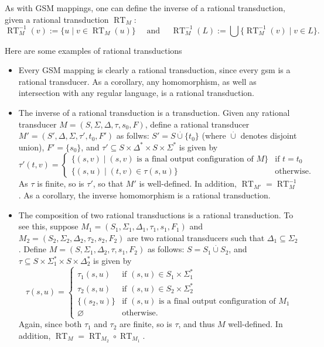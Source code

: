 \documentclass[12pt]{article}
\begin{document}
As with GSM mappings, one can define the inverse of a rational transduction, given a rational transduction $\operatorname{RT}_M$: $$\operatorname{RT}_M^{-1}(v):=\lbrace u\mid v\in \operatorname{RT}_M(u) \rbrace \quad\mbox{ and }\quad \operatorname{RT}_M^{-1}(L):=\bigcup \lbrace \operatorname{RT}_M^{-1}(v) \mid v\in L\rbrace.$$

Here are some examples of rational transductions
\begin{itemize}
\item Every GSM mapping is clearly a rational transduction, since every gsm is a rational transducer.  As a corollary, any homomorphism, as well as intersection with any regular language, is a rational transduction.
\item The inverse of a rational transduction is a transduction.  Given any rational transducer $M=(S,\Sigma,\Delta,\tau, s_0,F)$, define a rational transducer $M'=(S',\Delta,\Sigma,\tau',t_0,F')$ as follws: $S'=S\stackrel{\cdot}{\cup}\lbrace t_0\rbrace$ (where $\stackrel{\cdot}{\cup}$ denotes disjoint union), $F'=\lbrace s_0\rbrace$, and $\tau' \subseteq S\times \Delta^* \times S\times \Sigma^*$ is given by 
\begin{displaymath}
\tau'(t,v) = \left\{
\begin{array}{ll}
\lbrace (s,v)\mid (s,v)\mbox{ is a final output configuration of }M \rbrace & \textrm{if } t=t_0 \\
\lbrace (s,u)\mid (t,v)\in \tau(s,u) \rbrace & \textrm{otherwise.}
\end{array}
\right.
\end{displaymath}
As $\tau$ is finite, so is $\tau'$, so that $M'$ is well-defined.  In addition, $\operatorname{RT}_{M'}=\operatorname{RT}_{M}^{-1}$.  As a corollary, the inverse homomorphism is a rational transduction.
\item The composition of two rational transductions is a rational transduction.  To see this, suppose $M_1=(S_1,\Sigma_1,\Delta_1, \tau_1,s_1,F_1)$ and $M_2=(S_2,\Sigma_2,\Delta_2,\tau_2,s_2,F_2)$ are two rational transducers such that $\Delta_1 \subseteq \Sigma_2$.  Define $M=(S,\Sigma_1,\Delta_2,\tau,s_1,F_2)$ as follows: $S=S_1\stackrel{\cdot}{\cup} S_2$, and $\tau \subseteq S \times \Sigma_1^* \times S\times \Delta_2^*$ is given by
\begin{displaymath}
\tau(s,u) = \left\{
\begin{array}{ll}
 \tau_1(s,u) & \textrm{if } (s,u)\in S_1\times \Sigma_1^* \\
 \tau_2(s,u) & \textrm{if } (s,u)\in S_2\times \Sigma_2^* \\
 \lbrace (s_2,u)\rbrace & \textrm{if } (s,u)\textrm{ is a final output configuration of } M_1 \\
 \varnothing & \textrm{otherwise.}
\end{array}
\right.
\end{displaymath}
Again, since both $\tau_1$ and $\tau_2$ are finite, so is $\tau$, and thus $M$ well-defined.  In addition, $\operatorname{RT}_M=\operatorname{RT}_{M_2} \circ \operatorname{RT}_{M_1}$.
\end{itemize}
\end{document}
